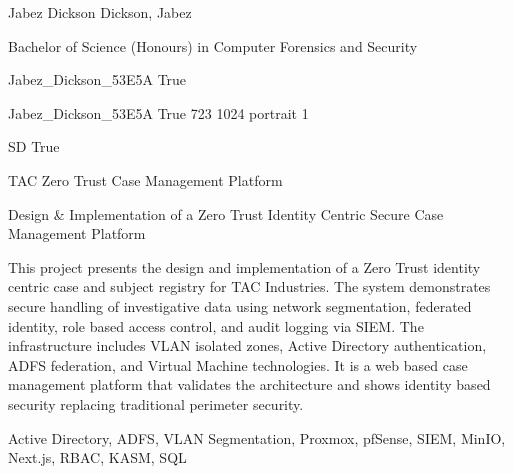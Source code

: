 
\begingroup{}\relax



\def\Key{Jabez_Dickson_53E5A}

{Jabez Dickson}
{Dickson, Jabez}

{Bachelor of Science (Honours) in Computer Forensics and Security}

{Jabez_Dickson_53E5A}
{True}

{Jabez_Dickson_53E5A}
{True}
{723}
{1024}
{portrait}
{1}

{SD}
{True}

{TAC Zero Trust Case Management Platform}

{Design \& Implementation of a Zero Trust Identity Centric Secure Case Management Platform}

{This project presents the design and implementation of a Zero Trust identity centric case and subject registry for TAC Industries.  The system demonstrates secure handling of investigative data using network segmentation, federated identity, role based access control, and audit logging via SIEM.  The infrastructure includes VLAN isolated zones, Active Directory authentication, ADFS federation, and Virtual Machine technologies. It is a web based case management platform that validates the architecture and shows identity based security replacing traditional perimeter security.}

{Active Directory, ADFS, VLAN Segmentation, Proxmox, pfSense, SIEM, MinIO, Next.js, RBAC, KASM, SQL}

